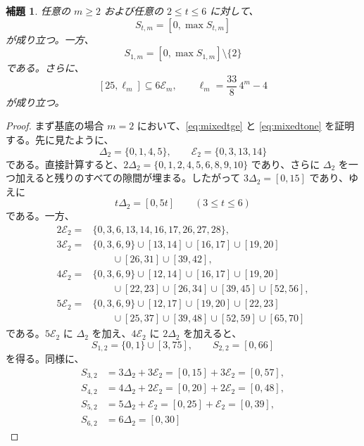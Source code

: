 \documentclass[12pt]{ltjsarticle}
\theoremstyle{plain}
\newtheorem{lemma}[theorem]{補題}
\theoremstyle{definition}
\theoremstyle{plain}
\begin{document}
\begin{lemma}\label{lem:mixed}
任意の $m\geq2$ および任意の $2\leq t\leq6$ に対して、
\begin{equation}\label{eq:mixedtge}
 S_{t,m}=[0,\max S_{t,m}]
\end{equation}
が成り立つ。一方、
\begin{equation}\label{eq:mixedtone}
 S_{1,m}=[0,\max S_{1,m}]\setminus\{2\}
\end{equation}
である。さらに、
\begin{equation}\label{eq:mixedEminterval}
 [25,\ell_m]\subseteq6\mathcal E_m,
 \qquad \ell_m=\frac{33}{8}\,4^m-4
\end{equation}
が成り立つ。
\end{lemma}

\begin{proof}
まず基底の場合 $m=2$ において、\eqref{eq:mixedtge} と \eqref{eq:mixedtone} を証明する。先に見たように、
\[
 \Delta_2=\{0,1,4,5\},\qquad \mathcal E_2=\{0,3,13,14\}
\]
である。直接計算すると、$2\Delta_2=\{0,1,2,4,5,6,8,9,10\}$ であり、さらに $\Delta_2$ を一つ加えると残りのすべての隙間が埋まる。したがって $3\Delta_2=[0,15]$ であり、ゆえに
\[
 t\Delta_2=[0,5t]\qquad(3\leq t\leq6)
\]
である。一方、
\[
\begin{aligned}
2\mathcal E_2
={}&\{0,3,6,13,14,16,17,26,27,28\},\\[1ex]
3\mathcal E_2
={}&\{0,3,6,9\}\cup[13,14]\cup[16,17]\cup[19,20]\\
&\qquad\cup[26,31]\cup[39,42],\\[1ex]
4\mathcal E_2
={}&\{0,3,6,9\}\cup[12,14]\cup[16,17]\cup[19,20]\\
&\qquad\cup[22,23]\cup[26,34]\cup[39,45]\cup[52,56],\\[1ex]
5\mathcal E_2
={}&\{0,3,6,9\}\cup[12,17]\cup[19,20]\cup[22,23]\\
&\qquad\cup[25,37]\cup[39,48]\cup[52,59]\cup[65,70]
\end{aligned}
\]
である。$5\mathcal E_2$ に $\Delta_2$ を加え、$4\mathcal E_2$ に $2\Delta_2$ を加えると、
\[
 S_{1,2}=\{0,1\}\cup[3,75],\qquad S_{2,2}=[0,66]
\]
を得る。同様に、
\[
\begin{aligned}
S_{3,2}&=3\Delta_2+3\mathcal E_2=[0,15]+3\mathcal E_2=[0,57],\\[1ex]
S_{4,2}&=4\Delta_2+2\mathcal E_2=[0,20]+2\mathcal E_2=[0,48],\\[1ex]
S_{5,2}&=5\Delta_2+\mathcal E_2=[0,25]+\mathcal E_2=[0,39],\\[1ex]
S_{6,2}&=6\Delta_2=[0,30]
\end{aligned}
\]
\end{proof}
\end{document}
